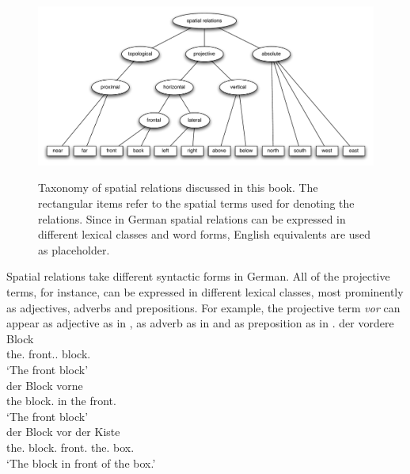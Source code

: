 \begin{figure}
\includegraphics[width=\columnwidth]{figs/spatial-relations-taxonomy}
\label{f:spatial-relations-taxonomy}
\caption[Taxonomy of spatial relations in German.]{%
Taxonomy of spatial relations discussed in this book.
The rectangular items refer to the spatial terms used for denoting
the relations. Since in German spatial relations can be expressed in
different lexical classes and word forms, English
equivalents are used as placeholder.}
\end{figure}

Spatial relations take different syntactic forms in German. 
All of the projective terms, for instance, can be expressed in different 
lexical classes, most prominently as adjectives, adverbs and prepositions. 
For example, the projective term \textit{vor} can appear as adjective as in 
, as adverb as in  
and as preposition as in . 
\ea
\label{e:5:der-vordere-block}
\gll der vordere Block\\
the.{\NOM} front.{\ADJ}.{\NOM} block.{\NOM} \\
\glt `The front block'\\
\z
\ea
\label{e:5:der-block-vorne}
\gll der Block vorne\\
the block.{\NOM} {in the front.{\ADV}} \\
\glt `The front block'\\
\z
\ea
\label{e:5:der-block-vor-der-kiste}
\gll der Block vor der Kiste\\
the.{\NOM} block.{\NOM} front.{\PREP} the.{\DAT} box.{\DAT} \\
\glt `The block in front of the box.'\\
\z

